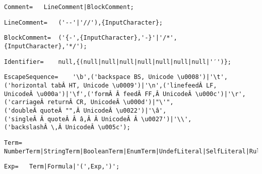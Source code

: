 \documentclass{article}
\begin{document}
    \begin{flushleft}
    \begin{lstlisting}[mathescape=true, breaklines=true]
     Comment= 	LineComment|BlockComment;
    \end{lstlisting}
    \end{flushleft}
    \begin{flushleft}
    \begin{lstlisting}[mathescape=true, breaklines=true]
     LineComment= 	('--'|'//'),{InputCharacter};
    \end{lstlisting}
    \end{flushleft}
    \begin{flushleft}
    \begin{lstlisting}[mathescape=true, breaklines=true]
     BlockComment= 	('{-',{InputCharacter},'-}'|'/*',{InputCharacter},'*/');
    \end{lstlisting}
    \end{flushleft}
    \begin{flushleft}
    \begin{lstlisting}[mathescape=true, breaklines=true]
     Identifier= 	null,{(null|null|null|null|null|null|null|'′')};
    \end{lstlisting}
    \end{flushleft}
    \begin{flushleft}
    \begin{lstlisting}[mathescape=true, breaklines=true]
     EscapeSequence= 	'\b',('backspace BS, Unicode \u0008')|'\t',('horizontal tabÂ HT, Unicode \u0009')|'\n',('linefeedÂ LF, UnicodeÂ \u000a')|'\f',('formÂ Â feedÂ FF,Â UnicodeÂ \u000c')|'\r',('carriageÂ returnÂ CR, UnicodeÂ \u000d')|"\'",('doubleÂ quoteÂ "",Â UnicodeÂ \u0022')|'\â',('singleÂ Â quoteÂ Â â,Â Â UnicodeÂ Â \u0027')|'\\',('backslashÂ \,Â UnicodeÂ \u005c');
    \end{lstlisting}
    \end{flushleft}
    \begin{flushleft}
    \begin{lstlisting}[mathescape=true, breaklines=true]
     Term= 	NumberTerm|StringTerm|BooleanTerm|EnumTerm|UndefLiteral|SelfLiteral|RuleAsTerm|ValueTerm|StructureTerm;
    \end{lstlisting}
    \end{flushleft}
    \begin{flushleft}
    \begin{lstlisting}[mathescape=true, breaklines=true]
     Exp= 	Term|Formula|'(',Exp,')';
    \end{lstlisting}
    \end{flushleft}
\end{document}
